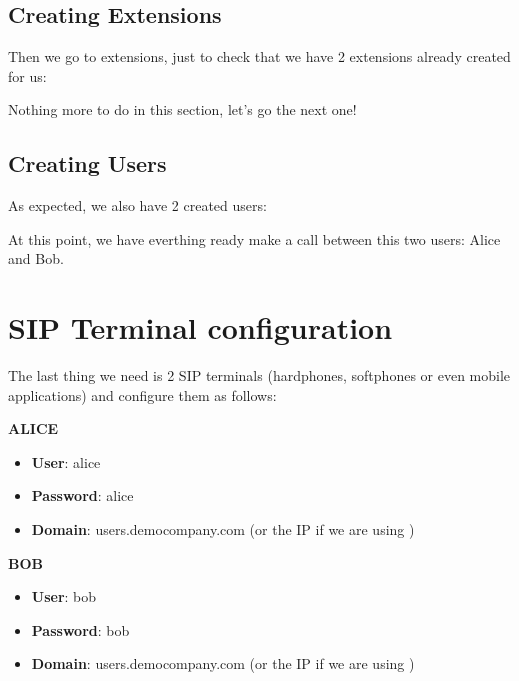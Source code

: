 \documentclass[letterpaper,10pt,english]{sphinxmanual}
\begin{document}
\subsection{Creating Extensions}
\label{internal_calls/company_portal:creating-extensions}
Then we go to extensions, just to check that we have 2 extensions already
created for us:

\noindent{}

Nothing more to do in this section, let's go the next one!


\subsection{Creating Users}
\label{internal_calls/company_portal:creating-users}
As expected, we also have 2 created users:

\noindent{}

At this point, we have everthing ready make a call between this two users:
Alice and Bob.


\section{SIP Terminal configuration}
\label{internal_calls/configure_sipuacs:sip-terminal-configuration}\label{internal_calls/configure_sipuacs::doc}
The last thing we need is 2 SIP terminals (hardphones, softphones or even
mobile applications) and configure them as follows:

\textbf{ALICE}
\begin{itemize}
\item {} 
\textbf{User}: alice

\item {} 
\textbf{Password}: alice

\item {} 
\textbf{Domain}: users.democompany.com (or the IP if we are using {\hyperref[internal_calls/brand_portal:dnshack]{}})

\end{itemize}

\textbf{BOB}
\begin{itemize}
\item {} 
\textbf{User}: bob

\item {} 
\textbf{Password}: bob

\item {} 
\textbf{Domain}: users.democompany.com (or the IP if we are using {\hyperref[internal_calls/brand_portal:dnshack]{}})

\end{itemize}
\end{document}
